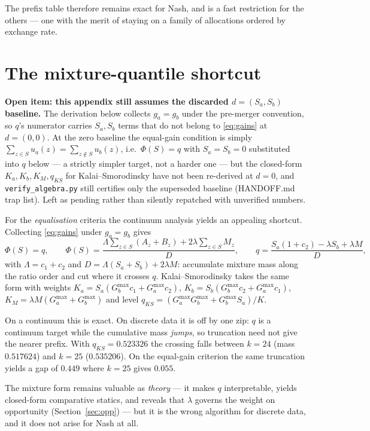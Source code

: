 \documentclass[11pt]{article}
\theoremstyle{remark}\newtheorem*{remark}{Remark}
\newcommand{\Sa}{S_a}\newcommand{\Sb}{S_b}\newcommand{\Amax}{G_a^{\max}}\newcommand{\Bmax}{G_b^{\max}}
\begin{document}
\noindent The prefix table therefore remains exact for Nash, and is a fast restriction
for the others --- one with the merit of staying on a family of allocations ordered by
exchange rate.

\section{The mixture-quantile shortcut}\label{app:mixture}

\begin{warnbox}
\textbf{Open item: this appendix still assumes the discarded $d=(\Sa,\Sb)$ baseline.}
The derivation below collects $g_a=g_b$ under the pre-merger convention, so $q$'s
numerator carries $\Sa,\Sb$ terms that do not belong to \eqref{eq:gains} at $d=(0,0)$.
At the zero baseline the equal-gain condition is simply
$\sum_{z\in S}u_a(z)=\sum_{z\notin S}u_b(z)$, i.e.\ $\Phi(S)=q$ with $\Sa=\Sb=0$
substituted into $q$ below --- a strictly simpler target, not a harder one --- but the
closed-form $K_a,K_b,K_M,q_{KS}$ for Kalai--Smorodinsky have not been re-derived at
$d=0$, and \texttt{verify\_algebra.py} still certifies only the superseded baseline
(HANDOFF.md trap list). Left as pending rather than silently repatched with unverified
numbers.
\end{warnbox}

For the \emph{equalisation} criteria the continuum analysis yields an appealing
shortcut. Collecting \eqref{eq:gains} under $g_a=g_b$ gives
\begin{equation}
\Phi(S)=q,\qquad
\Phi(S)=\frac{\Lambda\sum_{z\in S}(A_z+B_z)+2\lambda\sum_{z\in S}M_z}{D},
\qquad q=\frac{\Sa(1+c_2)-\lambda\Sb+\lambda M}{D},
\end{equation}
with $\Lambda=c_1+c_2$ and $D=\Lambda(\Sa+\Sb)+2\lambda M$: accumulate mixture mass
along the ratio order and cut where it crosses $q$. Kalai--Smorodinsky takes the same
form with weights $K_a=\Sa(\Bmax c_1+\Amax c_2)$, $K_b=\Sb(\Bmax c_2+\Amax c_1)$,
$K_M=\lambda M(\Amax+\Bmax)$ and level $q_{KS}=(\Amax\Bmax+\Bmax\Sa)/K$.

\begin{warnbox}
On a continuum this is exact. On discrete data it is off by one zip: $q$ is a continuum
target while the cumulative mass \emph{jumps}, so truncation need not give the nearer
prefix. With $q_{KS}=0.523326$ the crossing falls between $k=24$ (mass $0.517624$) and
$k=25$ ($0.535206$). On the equal-gain criterion the same truncation yields a gap of
$0.449$ where $k=25$ gives $0.055$.
\end{warnbox}

\noindent The mixture form remains valuable as \emph{theory} --- it makes $q$
interpretable, yields closed-form comparative statics, and reveals that $\lambda$
governs the weight on opportunity (Section~\ref{sec:opp}) --- but it is the wrong
algorithm for discrete data, and it does not arise for Nash at all.
\end{document}
